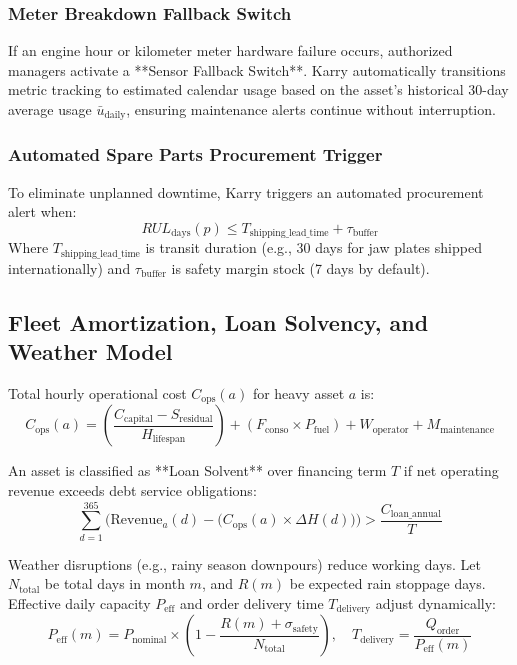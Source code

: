 \documentclass[11pt, a4paper]{article}
\begin{document}
\subsubsection{Meter Breakdown Fallback Switch}
If an engine hour or kilometer meter hardware failure occurs, authorized managers activate a **Sensor Fallback Switch**. Karry automatically transitions metric tracking to estimated calendar usage based on the asset's historical 30-day average usage $\bar{u}_{\text{daily}}$, ensuring maintenance alerts continue without interruption.

\subsubsection{Automated Spare Parts Procurement Trigger}
To eliminate unplanned downtime, Karry triggers an automated procurement alert when:
\begin{equation}
    RUL_{\text{days}}(p) \le T_{\text{shipping\_lead\_time}} + \tau_{\text{buffer}}
\end{equation}
Where $T_{\text{shipping\_lead\_time}}$ is transit duration (e.g., 30 days for jaw plates shipped internationally) and $\tau_{\text{buffer}}$ is safety margin stock (7 days by default).

\subsection{Fleet Amortization, Loan Solvency, and Weather Model}
Total hourly operational cost $C_{\text{ops}}(a)$ for heavy asset $a$ is:
\begin{equation}
    C_{\text{ops}}(a) = \left( \frac{C_{\text{capital}} - S_{\text{residual}}}{H_{\text{lifespan}}} \right) + (F_{\text{conso}} \times P_{\text{fuel}}) + W_{\text{operator}} + M_{\text{maintenance}}
\end{equation}

An asset is classified as **Loan Solvent** over financing term $T$ if net operating revenue exceeds debt service obligations:
\begin{equation}
    \sum_{d=1}^{365} \Big( \text{Revenue}_a(d) - \big( C_{\text{ops}}(a) \times \Delta H(d) \big) \Big) > \frac{C_{\text{loan\_annual}}}{T}
\end{equation}

Weather disruptions (e.g., rainy season downpours) reduce working days. Let $N_{\text{total}}$ be total days in month $m$, and $R(m)$ be expected rain stoppage days. Effective daily capacity $P_{\text{eff}}$ and order delivery time $T_{\text{delivery}}$ adjust dynamically:
\begin{equation}
    P_{\text{eff}}(m) = P_{\text{nominal}} \times \left( 1 - \frac{R(m) + \sigma_{\text{safety}}}{N_{\text{total}}} \right), \quad T_{\text{delivery}} = \frac{Q_{\text{order}}}{P_{\text{eff}}(m)}
\end{equation}
\end{document}
